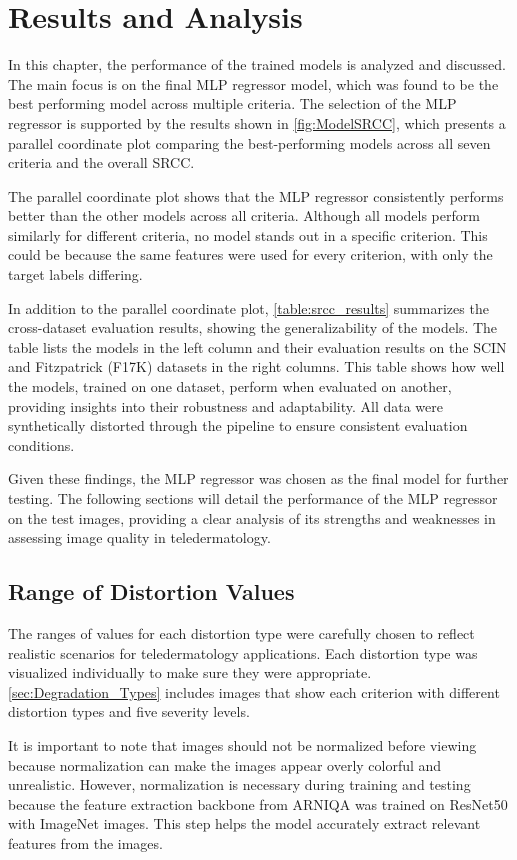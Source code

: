 \chapter{Results and Analysis}
\label{ch:ResultsAnalysis}
In this chapter, the performance of the trained models is analyzed and discussed. The main focus is on the final MLP regressor model, which was found to be the best performing model across multiple criteria. The selection of the MLP regressor is supported by the results shown in \autoref{fig:ModelSRCC}, which presents a parallel coordinate plot comparing the best-performing models across all seven criteria and the overall SRCC.\par
The parallel coordinate plot shows that the MLP regressor consistently performs better than the other models across all criteria. Although all models perform similarly for different criteria, no model stands out in a specific criterion. This could be because the same features were used for every criterion, with only the target labels differing. \par
\vspace{\baselineskip}
\noindent
In addition to the parallel coordinate plot, \autoref{table:srcc_results} summarizes the cross-dataset evaluation results, showing the generalizability of the models. The table lists the models in the left column and their evaluation results on the SCIN and Fitzpatrick (F17K) datasets in the right columns. This table shows how well the models, trained on one dataset, perform when evaluated on another, providing insights into their robustness and adaptability. All data were synthetically distorted through the pipeline to ensure consistent evaluation conditions. \par
\vspace{\baselineskip}
\noindent
Given these findings, the MLP regressor was chosen as the final model for further testing. The following sections will detail the performance of the MLP regressor on the test images, providing a clear analysis of its strengths and weaknesses in assessing image quality in teledermatology. \par

\section{Range of Distortion Values}
\label{sec:RangeDistortionValues}
The ranges of values for each distortion type were carefully chosen to reflect realistic scenarios for teledermatology  applications. Each distortion type was visualized individually to make sure they were appropriate. \autoref{sec:Degradation_Types} includes images that show each criterion with different distortion types and five severity levels. \par
\vspace{\baselineskip}
\noindent
It is important to note that images should not be normalized before viewing because normalization can make the images appear overly colorful and unrealistic. However, normalization is necessary during training and testing because the feature extraction backbone from ARNIQA\autocite{ARNIQA} was trained on ResNet50 with ImageNet images. This step helps the model accurately extract relevant features from the images. \par
